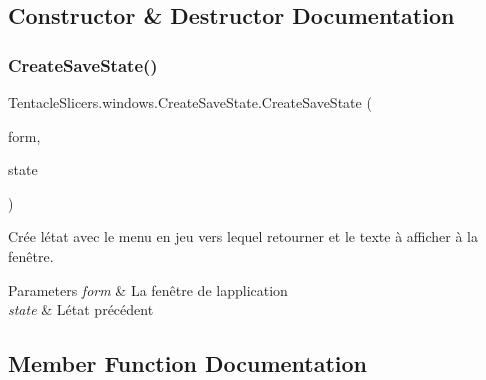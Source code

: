 \subsection{Constructor \& Destructor Documentation}
\mbox{\label{class_tentacle_slicers_1_1windows_1_1_create_save_state_a91e1d436055ed7a3a759d3a23b832d1c}} 
\subsubsection{\texorpdfstring{Create\+Save\+State()}{CreateSaveState()}}
{\footnotesize\ttfamily Tentacle\+Slicers.\+windows.\+Create\+Save\+State.\+Create\+Save\+State (\begin{DoxyParamCaption}\item[{\hyperlink{class_tentacle_slicers_1_1windows_1_1_main_form}{Main\+Form}}]{form,  }\item[{\hyperlink{class_tentacle_slicers_1_1windows_1_1_windows_state}{Windows\+State}}]{state }\end{DoxyParamCaption})}



Crée l\textquotesingle{}état avec le menu en jeu vers lequel retourner et le texte à afficher à la fenêtre. 


\begin{DoxyParams}{Parameters}
{\em form} & La fenêtre de l\textquotesingle{}application \\
\hline
{\em state} & L\textquotesingle{}état précédent \\
\hline
\end{DoxyParams}


\subsection{Member Function Documentation}
\mbox{\label{class_tentacle_slicers_1_1windows_1_1_create_save_state_aeaa70c2f8e3d4279c54e7f8032f99465}} 

